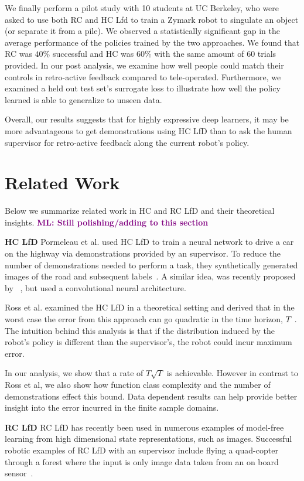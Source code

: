\documentclass[10pt, conference]{ieeeconf}      %
\newcommand{\ns}{HC LfD }
\newcommand{\nc}{RC LfD }
\newcommand{\mlnote}[1]{\ifthenelse{ \boolean{include-notes}}%
 {\textcolor{purple}{\textbf{ML: #1}}}{}}
\begin{document}
We finally perform a pilot study with 10 students at UC Berkeley, who were asked to use both RC and HC Lfd to train a Zymark robot to singulate an object (or separate it from a pile). We observed a statistically significant gap in the average performance of the policies trained by the two approaches. We found that RC was $40\%$ successful and HC was $60\%$ with the same amount of $60$ trials provided. In our post analysis, we examine how well people could match their controls in retro-active feedback compared to tele-operated. Furthermore, we examined a held out test set's surrogate loss to illustrate how well the policy learned is able to generalize to unseen data.

Overall, our results suggests that for highly expressive deep learners, it may be more advantageous to get demonstrations using HC LfD than to ask the human supervisor for retro-active feedback  along the current robot's policy.

\section{Related Work}
Below we summarize related work in HC and RC LfD and their theoretical insights. \mlnote{Still polishing/adding to this section}

\noindent \textbf {\ns}
Pormeleau et al. used \ns to train a neural network to drive a car on the highway via demonstrations provided by an supervisor. To reduce the number of demonstrations needed to perform a task, they synthetically generated  images of the road and subsequent labels~\cite{pomerleau1989alvinn}. A similar idea, was recently proposed by ~\cite{NVIDEA}, but used a convolutional neural architecture. 

Ross et al. examined the \ns in a theoretical setting and derived that in the worst case the error from this approach can go quadratic in the time  horizon, $T$~\cite{ross2010efficient}. The intuition behind this analysis is that if the distribution induced by the robot's policy is different than the supervisor's, the robot could incur maximum error. 

In our analysis, we show that a rate of $T\sqrt{T}$ is achievable. However in contrast to Ross et al,  we also show how function class complexity and the number of demonstrations effect this bound. Data dependent results can help provide better insight into the error incurred in the finite sample domains. 

\noindent \textbf{\nc}
\nc has recently been used in numerous examples of model-free learning from high dimensional state representations, such as images. Successful robotic examples of \nc with an supervisor  include flying a quad-copter through a forest where the input is only image data taken from an on board sensor~\cite{ross2013learning}.
\end{document}
